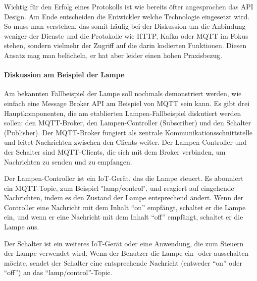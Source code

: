 \documentclass[../vs-script-first-v01.tex]{subfiles}
\begin{document}
Wichtig für den Erfolg eines Protokolls ist wie bereits öfter angesprochen das API Design. Am Ende entscheiden die Entwickler welche Technologie eingesetzt wird. So muss man verstehen, das somit häufig bei der Diskussion um die Anbindung weniger der Dienste und  die Protokolle wie HTTP, Kafka oder MQTT im Fokus stehen, sondern vielmehr der Zugriff auf die darin kodierten Funktionen. Diesen Ansatz mag man belächeln, er hat aber leider einen hohen Praxisbezug.  
\paragraph{Diskussion am Beispiel der Lampe}
Am bekannten Fallbeispiel der Lampe soll nochmals demonstriert werden, wie einfach eine Message Broker API am Beispiel von MQTT sein kann. Es gibt drei Hauptkomponenten, die am etablierten Lampen-Fallbeispiel diskutiert werden sollen: den MQTT-Broker, den Lampen-Controller (Subscriber) und den Schalter (Publisher). Der MQTT-Broker fungiert als zentrale Kommunikationsschnittstelle und leitet Nachrichten zwischen den Clients weiter. Der Lampen-Controller und der Schalter sind MQTT-Clients, die sich mit dem Broker verbinden, um Nachrichten zu senden und zu empfangen.

Der Lampen-Controller ist ein IoT-Gerät, das die Lampe steuert. Es abonniert ein MQTT-Topic, zum Beispiel "lamp/control", und reagiert auf eingehende Nachrichten, indem es den Zustand der Lampe entsprechend ändert. Wenn der Controller eine Nachricht mit dem Inhalt \enquote{on} empfängt, schaltet er die Lampe ein, und wenn er eine Nachricht mit dem Inhalt \enquote{off} empfängt, schaltet er die Lampe aus.

Der Schalter ist ein weiteres IoT-Gerät oder eine Anwendung, die zum Steuern der Lampe verwendet wird. Wenn der Benutzer die Lampe ein- oder ausschalten möchte, sendet der Schalter eine entsprechende Nachricht (entweder \enquote{on} oder \enquote{off}) an das \enquote{lamp/control}-Topic.
\end{document}
